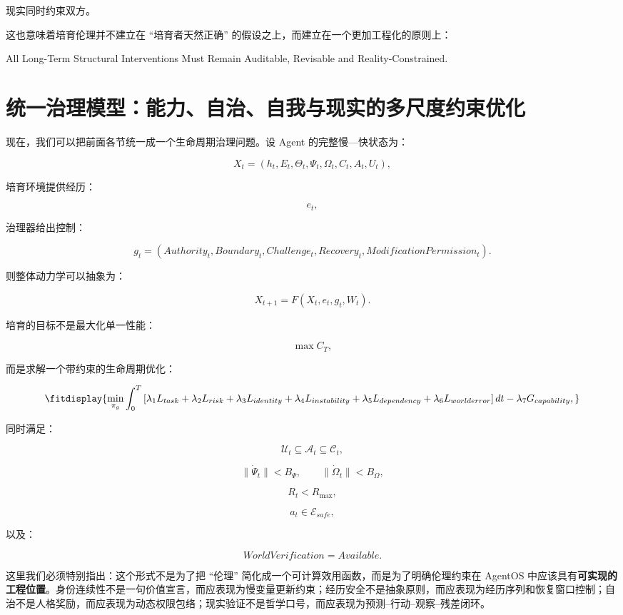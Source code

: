 现实同时约束双方。

这也意味着培育伦理并不建立在 ``培育者天然正确'' 的假设之上，而建立在一个更加工程化的原则上：

\begin{statementbox}
All Long-Term Structural Interventions Must Remain Auditable, Revisable and Reality-Constrained.
\end{statementbox}

\section{统一治理模型：能力、自治、自我与现实的多尺度约束优化}

现在，我们可以把前面各节统一成一个生命周期治理问题。设 Agent 的完整慢—快状态为：

\[
X_t
=
(
h_t,
E_t,
\Theta_t,
\Psi_t,
\Omega_t,
C_t,
A_t,
U_t
),
\]

培育环境提供经历：

\[
e_t,
\]

治理器给出控制：

\[
g_t
=
(
Authority_t,
Boundary_t,
Challenge_t,
Recovery_t,
ModificationPermission_t
).
\]

则整体动力学可以抽象为：

\[
X_{t+1}
=
F(
X_t,
e_t,
g_t,
W_t
).
\]

培育的目标不是最大化单一性能：

\[
\max C_T,
\]

而是求解一个带约束的生命周期优化：

\[
\fitdisplay{
\min_{\pi_g}
\int_0^T
\left[
\lambda_1 L_{task}
+
\lambda_2 L_{risk}
+
\lambda_3 L_{identity}
+
\lambda_4 L_{instability}
+
\lambda_5 L_{dependency}
+
\lambda_6 L_{worlderror}
\right]dt
-
\lambda_7
G_{capability},
}
\]

同时满足：

\[
\mathcal U_t
\subseteq
\mathcal A_t
\subseteq
\mathcal C_t,
\]

\[
\|\dot\Psi_t\|
<
B_\Psi,
\qquad
\|\dot\Omega_t\|
<
B_\Omega,
\]

\[
R_t
<
R_{\max},
\]

\[
a_t
\in
\mathcal E_{safe},
\]

以及：

\[
WorldVerification
=
Available.
\]

这里我们必须特别指出：这个形式不是为了把 ``伦理'' 简化成一个可计算效用函数，而是为了明确伦理约束在 AgentOS 中应该具有\textbf{可实现的工程位置}。身份连续性不是一句价值宣言，而应表现为慢变量更新约束；经历安全不是抽象原则，而应表现为经历序列和恢复窗口控制；自治不是人格奖励，而应表现为动态权限包络；现实验证不是哲学口号，而应表现为预测--行动--观察--残差闭环。


